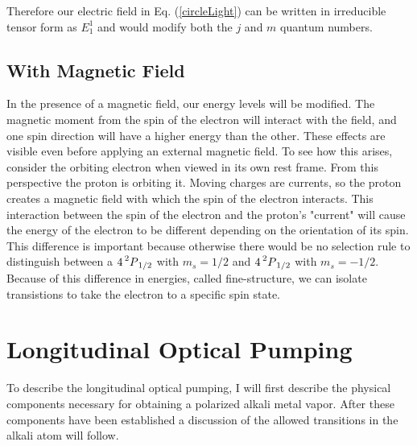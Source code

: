 \documentclass[12pt]{article}
\begin{document}
		Therefore our electric field in Eq. (\ref{circleLight}) can
		be written in irreducible tensor form as $E^{1}_1$ and 
		would modify both the $j$ and $m$ 
		quantum numbers.
\subsection{With Magnetic Field}
	In the presence of a magnetic field, our energy levels will be modified.
	The magnetic moment from the spin of the electron will interact
	with the field, and one spin direction will have a 
	higher energy than the other. These effects are
	visible even before applying an external 
	magnetic field. To see how this arises, 
	consider the orbiting electron
	when viewed in its own rest frame. From this
	perspective the  
	proton is orbiting it. Moving charges
	are currents, so the proton creates a
	magnetic field with which the spin of the electron 
	interacts. This interaction between the spin of the 
	electron and the proton's "current" will cause
	the energy of the electron to be different depending
	on the orientation of its spin. This difference is 
	important because otherwise there would be no 
	selection rule to distinguish
	between a $4\prescript{2}{}P_{1/2}$ with 
	$m_s=1/2$ and $4\prescript{2}{}P_{1/2}$ with $m_s=-1/2$.
	Because of this difference in energies, called 
	fine-structure, we can isolate transistions to take
	the electron to a specific spin state.

%

\section{Longitudinal Optical Pumping}
To describe the longitudinal optical pumping, I will
first describe the physical components necessary for
obtaining a polarized alkali metal vapor. After these 
components have been established a discussion of the 
allowed transitions in the alkali atom will follow. 
\end{document}
